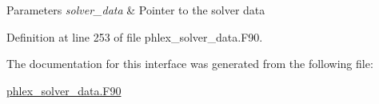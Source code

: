 \begin{DoxyParams}{Parameters}
{\em solver\+\_\+data} & Pointer to the solver data \\
\hline
\end{DoxyParams}


Definition at line 253 of file phlex\+\_\+solver\+\_\+data.\+F90.



The documentation for this interface was generated from the following file\+:\begin{DoxyCompactItemize}
\item 
\mbox{\hyperlink{phlex__solver__data_8_f90}{phlex\+\_\+solver\+\_\+data.\+F90}}\end{DoxyCompactItemize}
